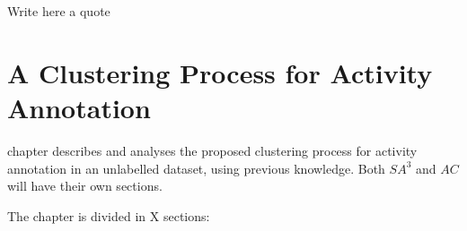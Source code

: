 

\begin{savequote}[50mm]
Write here a quote
\end{savequote}


\chapter{A Clustering Process for Activity Annotation}
\label{cha:clustering}

\ifpdf
    \graphicspath{{4_clustering_process/figures/PDF/}{4_clustering_process/figures/PNG/}{4_clustering_process/figures/}}
\else
    \graphicspath{{4_clustering_process/figures/EPS/}{4_clustering_process/figures/}}
\fi

 chapter describes and analyses the proposed clustering process for activity annotation in an unlabelled dataset, using previous knowledge. Both $SA^3$ and $AC$ will have their own sections.

The chapter is divided in X sections: